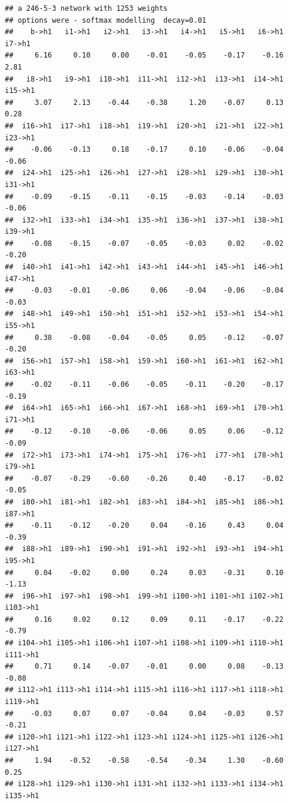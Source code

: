 \documentclass[
]{article}
\begin{document}
\begin{verbatim}
## a 246-5-3 network with 1253 weights
## options were - softmax modelling  decay=0.01
##    b->h1   i1->h1   i2->h1   i3->h1   i4->h1   i5->h1   i6->h1   i7->h1 
##     6.16     0.10     0.00    -0.01    -0.05    -0.17    -0.16     2.81 
##   i8->h1   i9->h1  i10->h1  i11->h1  i12->h1  i13->h1  i14->h1  i15->h1 
##     3.07     2.13    -0.44    -0.38     1.20    -0.07     0.13     0.28 
##  i16->h1  i17->h1  i18->h1  i19->h1  i20->h1  i21->h1  i22->h1  i23->h1 
##    -0.06    -0.13     0.18    -0.17     0.10    -0.06    -0.04    -0.06 
##  i24->h1  i25->h1  i26->h1  i27->h1  i28->h1  i29->h1  i30->h1  i31->h1 
##    -0.09    -0.15    -0.11    -0.15    -0.03    -0.14    -0.03    -0.06 
##  i32->h1  i33->h1  i34->h1  i35->h1  i36->h1  i37->h1  i38->h1  i39->h1 
##    -0.08    -0.15    -0.07    -0.05    -0.03     0.02    -0.02    -0.20 
##  i40->h1  i41->h1  i42->h1  i43->h1  i44->h1  i45->h1  i46->h1  i47->h1 
##    -0.03    -0.01    -0.06     0.06    -0.04    -0.06    -0.04    -0.03 
##  i48->h1  i49->h1  i50->h1  i51->h1  i52->h1  i53->h1  i54->h1  i55->h1 
##     0.38    -0.08    -0.04    -0.05     0.05    -0.12    -0.07    -0.20 
##  i56->h1  i57->h1  i58->h1  i59->h1  i60->h1  i61->h1  i62->h1  i63->h1 
##    -0.02    -0.11    -0.06    -0.05    -0.11    -0.20    -0.17    -0.19 
##  i64->h1  i65->h1  i66->h1  i67->h1  i68->h1  i69->h1  i70->h1  i71->h1 
##    -0.12    -0.10    -0.06    -0.06     0.05     0.06    -0.12    -0.09 
##  i72->h1  i73->h1  i74->h1  i75->h1  i76->h1  i77->h1  i78->h1  i79->h1 
##    -0.07    -0.29    -0.60    -0.26     0.40    -0.17    -0.02    -0.05 
##  i80->h1  i81->h1  i82->h1  i83->h1  i84->h1  i85->h1  i86->h1  i87->h1 
##    -0.11    -0.12    -0.20     0.04    -0.16     0.43     0.04    -0.39 
##  i88->h1  i89->h1  i90->h1  i91->h1  i92->h1  i93->h1  i94->h1  i95->h1 
##     0.04    -0.02     0.00     0.24     0.03    -0.31     0.10    -1.13 
##  i96->h1  i97->h1  i98->h1  i99->h1 i100->h1 i101->h1 i102->h1 i103->h1 
##     0.16     0.02     0.12     0.09     0.11    -0.17    -0.22    -0.79 
## i104->h1 i105->h1 i106->h1 i107->h1 i108->h1 i109->h1 i110->h1 i111->h1 
##     0.71     0.14    -0.07    -0.01     0.00     0.08    -0.13    -0.08 
## i112->h1 i113->h1 i114->h1 i115->h1 i116->h1 i117->h1 i118->h1 i119->h1 
##    -0.03     0.07     0.07    -0.04     0.04    -0.03     0.57    -0.21 
## i120->h1 i121->h1 i122->h1 i123->h1 i124->h1 i125->h1 i126->h1 i127->h1 
##     1.94    -0.52    -0.58    -0.54    -0.34     1.30    -0.60     0.25 
## i128->h1 i129->h1 i130->h1 i131->h1 i132->h1 i133->h1 i134->h1 i135->h1 

\end{verbatim}
\end{document}
